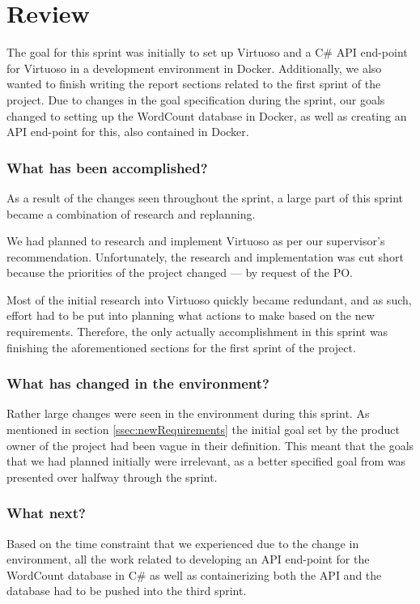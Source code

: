 \section{Review}
The goal for this sprint was initially to set up Virtuoso and a C\# API end-point for Virtuoso in a development environment in Docker. 
Additionally, we also wanted to finish writing the report sections related to the first sprint of the \knox{} project. 
Due to changes in the goal specification during the sprint, our goals changed to setting up the WordCount database in Docker, as well as creating an API end-point for this, also contained in Docker.

\subsubsection*{What has been accomplished?}
As a result of the changes seen throughout the sprint, a large part of this sprint became a combination of research and replanning. 

We had planned to research and implement Virtuoso as per our supervisor's recommendation.
Unfortunately, the research and implementation was cut short because the priorities of the \knox{} project changed --- by request of the PO.

Most of the initial research into Virtuoso quickly became redundant, and as such, effort had to be put into planning what actions to make based on the new requirements. 
Therefore, the only actually accomplishment in this sprint was finishing the aforementioned sections for the first sprint of the \knox{} project.  



\subsubsection*{What has changed in the environment?}
Rather large changes were seen in the environment during this sprint. As mentioned in section \ref{ssec:newRequirements} the initial goal set by the product owner of the \knox{} project had been vague in their definition. 
This meant that the goals that we had planned initially were irrelevant, as a better specified goal from \knox{} was presented over halfway through the sprint. 

\subsubsection*{What next?}
Based on the time constraint that we experienced due to the change in environment, all the work related to developing an API end-point for the WordCount database in C\# as well as containerizing both the API and the database had to be pushed into the third sprint.


